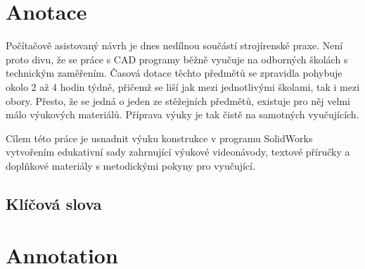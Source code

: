 \documentclass{template/socthesis}
\author{Petr Štourač}
\begin{document}

\maketitle



\makethanks{}

\pagestyle{empty}

\section*{Anotace}
Počítačově asistovaný návrh je dnes nedílnou součástí strojírenské praxe.
Není proto divu, že se práce s CAD programy běžně vyučuje na odborných školách s technickým zaměřením.
Časová dotace těchto předmětů se zpravidla pohybuje okolo 2 až 4 hodin týdně, přičemž se liší jak mezi jednotlivými školami, tak i mezi obory.
Přesto, že se jedná o jeden ze stěžejních předmětů, existuje pro něj velmi málo výukových materiálů.
Příprava výuky je tak čistě na samotných vyučujících.

Cílem této práce je usnadnit výuku konstrukce v programu SolidWorks vytvořením edukativní sady zahrnující výukové videonávody, textové příručky a doplňkové materiály s metodickými pokyny pro vyučující.

\subsection*{Klíčová slova}


\vspace{20mm}

\section*{Annotation}

\end{document}
